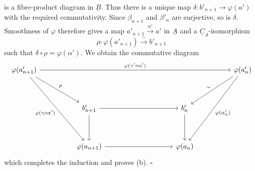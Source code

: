 
is a fibre-product diagram in $\underline B$. Thus there is a unique
map $\delta:b'_{n+1}\longrightarrow\varphi(a')$ with the required
commutativity. Since $\beta_{n+1}$ and $\beta'_n$ are surjective, so
is $\delta$. Smoothness of $\varphi$ therefore gives a map
$a'_{n+1}\xrightarrow{\alpha'}a'$ in $\underline A$ and a
$\underline C_\Lambda$-isomorphism
\[
 \rho:\varphi(a'_{n+1})\xrightarrow{\ \sim\ }b'_{n+1}
\]
such that $\delta\circ\rho=\varphi(\alpha')$. We obtain the
commutative diagram
\[
\begin{tikzcd}[row sep=huge,column sep=huge]
 \varphi(a'_{n+1})
   \arrow[rrrr,"{\varphi(\gamma'\circ\alpha')}"]
   \arrow[dr,"{\rho}"]
   \arrow[ddr,"{\varphi(\gamma\circ\alpha')}"']
 &&&& \varphi(a'_n)
   \arrow[dl,"{\sim}"']
   \arrow[ddl,"{\varphi(\alpha'_n)}"]\\
 & b'_{n+1} \arrow[rr] \arrow[d]
 && b'_n \arrow[d] &\\
 & \varphi(a_{n+1}) \arrow[rr]
 && \varphi(a_n) &
\end{tikzcd}
\]
which completes the induction and proves (b). \hfill$\square$

